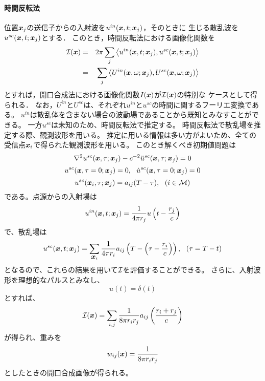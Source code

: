\documentclass[10pt,a4j,dvipdfmx]{jarticle}
\begin{document}
\paragraph{時間反転法}
位置$\mbox{\boldmath $x$}_j$の送信子からの入射波を$u^{in}(\mbox{\boldmath $x$},t;\mbox{\boldmath $x$}_j)$，そのときに
生じる散乱波を$u^{sc}(\mbox{\boldmath $x$},t;\mbox{\boldmath $x$}_j)$とする．
このとき，時間反転法における画像化関数を
\begin{eqnarray}
	{\cal I}(\mbox{\boldmath $x$})
		&=&
	2\pi
	\sum_{j}
	\left<
		u^{in}(\mbox{\boldmath $x$},t;\mbox{\boldmath $x$}_j), u^{sc}(\mbox{\boldmath $x$},t;\mbox{\boldmath $x$}_j)
	\right>
	\\
	&=&
	\sum_{j}
	\left<
		U^{in}(\mbox{\boldmath $x$},\omega;\mbox{\boldmath $x$}_j), U^{sc}(\mbox{\boldmath $x$},\omega;\mbox{\boldmath $x$}_j)
	\right>
	\label{eqn:}
\end{eqnarray}
とすれば，開口合成法における画像化関数$I(\mbox{\boldmath $x$})$が${\cal I}(\mbox{\boldmath $x$})$の特別な
ケースとして得られる．
なお，$U^{in}$と$U^{sc}$は、それぞれ$u^{in}$と$u^{sc}$の時間に関するフーリエ変換である。
$u^{in}$は散乱体を含まない場合の波動場であることから既知とみなすことができる。
一方$u^{sc}$は未知のため、時間反転法で推定する。
時間反転法で散乱場を推定する際、観測波形を用いる。
推定に用いる情報は多い方がよいため、全ての受信点$\mbox{\boldmath $x$}_i$で得られた観測波形を用いる。
このとき解くべき初期値問題は
\begin{equation}
	\nabla ^2 u^{sc}(\mbox{\boldmath $x$},\tau;\mbox{\boldmath $x$}_j)-c^{-2}\ddot{u}^{sc}(\mbox{\boldmath $x$},\tau; \mbox{\boldmath $x$}_j)=0
	\label{eqn:}
\end{equation}
\begin{equation}
	u^{sc}(\fat{x},\tau=0;\fat{x}_j)=0, \ \ 
	\dot{u}^{sc}(\fat{x},\tau=0;\fat{x}_j)=0
	\label{eqn:}
\end{equation}
\begin{equation}
	u^{sc}(\mbox{\boldmath $x$}_i,\tau;\mbox{\boldmath $x$}_j)=a_{ij}(T-\tau), \ \ (i \in {\cal M})
	\label{eqn:}
\end{equation}
である。点源からの入射場は
\begin{equation}
	u^{in}(\mbox{\boldmath $x$},t;\mbox{\boldmath $x$}_j)=\frac{1}{4\pi r_j}u\left(t-\frac{r_j}{c}\right)
	\label{eqn:}
\end{equation}
で、散乱場は
\begin{equation}
	u^{sc}(\mbox{\boldmath $x$},t;\mbox{\boldmath $x$}_j)=\sum_{\mbox{\boldmath $x$}_i}
	\frac{1}{4\pi r_i}a_{ij}\left(T-\left(\tau-\frac{r_i}{c}\right)\right), \ \ (\tau=T-t)
	\label{eqn:}
\end{equation}
となるので、これらの結果を用いて$\cal I$を評価することができる。
さらに、入射波形を理想的なパルスとみなし、
\begin{equation}
	u(t)=\delta(t)
	\label{eqn:}
\end{equation}
とすれば、
\begin{equation}
	{\cal I}(\mbox{\boldmath $x$})
	=
	\sum_{i,j} \frac{1}{8\pi r_ir_j} a_{ij} \left(\frac{r_i+r_j}{c}\right)
	\label{eqn:}
\end{equation}
が得られ、重みを
\begin{equation}
	w_{ij}(\mbox{\boldmath $x$})=\frac{1}{8\pi r_ir_j} 
	\label{eqn:}
\end{equation}
としたときの開口合成画像が得られる。
\end{document}
